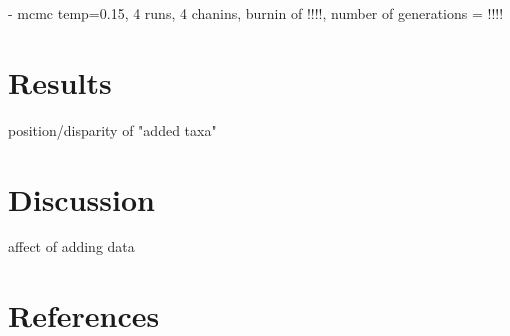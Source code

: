 \documentclass[a4paper,11pt]{article}
\begin{document}
 - mcmc temp=0.15, 4 runs, 4 chanins, burnin of !!!!, number of generations = !!!! 

\section{Results} 

position/disparity of "added taxa"

\section{Discussion}

affect of adding data


 










 

\section{References}



\end{document}
